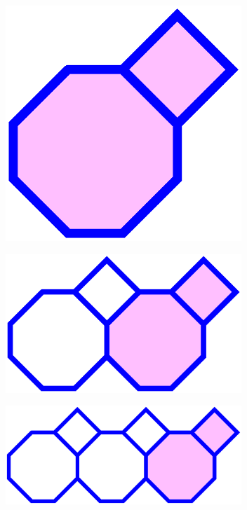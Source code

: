 \documentclass{beamer}
\begin{document}
\begin{frame}
  \begin{center}
    \includegraphics[width=3.5in]{periodic1}
  \end{center}
\end{frame}

\begin{frame}
  \begin{center}
    \includegraphics[width=3.5in]{periodic2}
  \end{center}
\end{frame}

\begin{frame}
  \begin{center}
    \includegraphics[width=3.5in]{periodic3}
  \end{center}
\end{frame}
\end{document}
